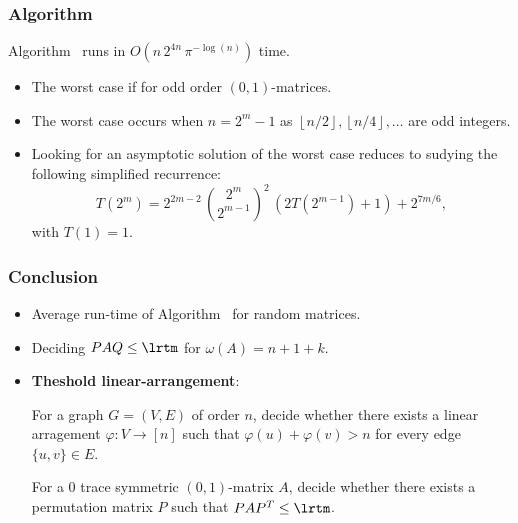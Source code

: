 \documentclass[unknownkeysallowed,11pt]{beamer}
\begin{document}
\begin{frame}
  \frametitle{Algorithm}

  \begin{theorem}
  Algorithm~ runs in
  \alert{$O\left(n\,2^{4n}\,\pi^{-\log(n)}\right)$} time.
  \end{theorem}

  \begin{itemize}
    \item
    The worst case if for odd order $(0,1)$-matrices.

    \medskip

    \item
    The worst case occurs when $n = 2^m - 1$ as
    $\left\lfloor n/2 \right\rfloor,
    \left\lfloor n/4 \right\rfloor,
    \ldots$ are odd integers.

    \medskip

    \item
    Looking for an asymptotic solution of the worst case reduces to sudying the
    following simplified recurrence:
    $$
    T(2^m)
    =
    2^{2m - 2} \,
    \binom{2^m}{2^{m-1}}^2 \,
    \left(2T(2^{m-1}) + 1\right) + 2^{7m/6},
    $$
    with $T(1) = 1$.
  \end{itemize}
\end{frame}


\begin{frame}
  \frametitle{Conclusion}

  \begin{itemize}
    \item
    Average run-time of Algorithm~
    for random matrices.

    \medskip

    \item
    Deciding $PAQ \leq \lrtm$ for $\omega(A) = n + 1 + k$.

    \medskip

    \item
    \textbf{Theshold linear-arrangement}:

    \medskip

    For a graph $G = (V,E)$ of order $n$,
    decide whether there exists a linear arragement
    $\varphi: V \to [n]$ such that
    $\varphi(u) + \varphi(v) > n$ for every
    edge $\{u, v\} \in E$.


    \medskip

    For a $0$ trace symmetric $(0,1)$-matrix $A$, decide
    whether there exists a permutation matrix $P$ such that
    $PAP^T \leq \lrtm$.
  \end{itemize}

\end{frame}

\end{document}
